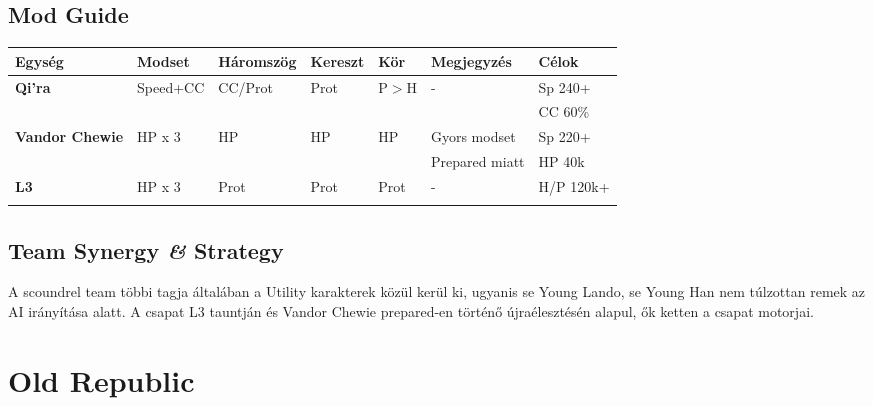 \documentclass[11pt]{report}
\begin{document}
\section{Mod Guide}
\begin{center}
    \begin{tabular}{|l | l | l | l | l | l | l |}
        \hline
        Egység & Modset & Háromszög & Kereszt & Kör & Megjegyzés & Célok\\ \hline
        \textbf{Qi'ra} & Speed+CC & CC/Prot & Prot & P$>$H & - & Sp 240+\\
        &  &  &  &  &  & CC 60\%\\ \hline
        \textbf{Vandor Chewie} & HP x 3 & HP & HP & HP & Gyors modset & Sp 220+\\
        &  &  &  &  & Prepared miatt & HP 40k\\ \hline
        \textbf{L3} & HP x 3 & Prot & Prot & Prot & - & H/P 120k+\\
        &  &  &  &  &  & \\ \hline
    \end{tabular}
\end{center}
\section{Team Synergy \textit{\&} Strategy}
A scoundrel team többi tagja általában a Utility karakterek közül kerül ki, ugyanis se Young Lando, se Young Han nem túlzottan remek az AI irányítása alatt. A csapat L3 tauntján és Vandor Chewie prepared-en történő újraélesztésén alapul, ők ketten a csapat motorjai.

\chapter{Old Republic}
\end{document}
